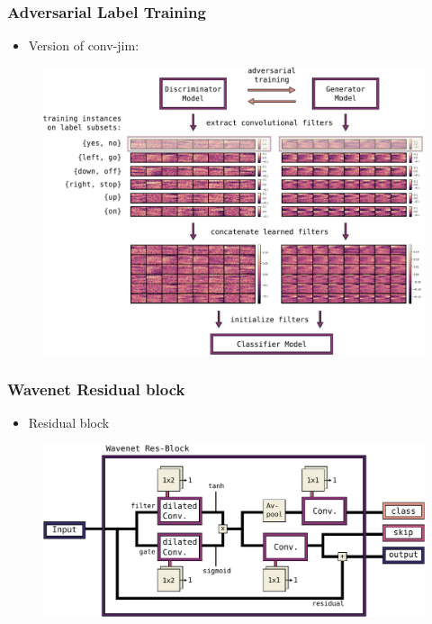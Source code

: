 \begin{frame}
  \frametitle{Adversarial Label Training}
  \vspace{-0.5cm}
  \begin{itemize}
    \small
    \item Version of conv-jim:
  \end{itemize}
  \begin{figure} \includegraphics[height=0.5\textheight]{../4_nn/figs/nn_adv_label_scheme.pdf} \end{figure}
\end{frame}


\begin{frame}
  \frametitle{Wavenet Residual block}
  \vspace{-0.5cm}
  \begin{itemize}
    \small
    \item Residual block
  \end{itemize}
  \begin{figure} \includegraphics[height=0.45\textheight]{../4_nn/figs/nn_arch_wavenet_block.pdf} \end{figure}
\end{frame}

